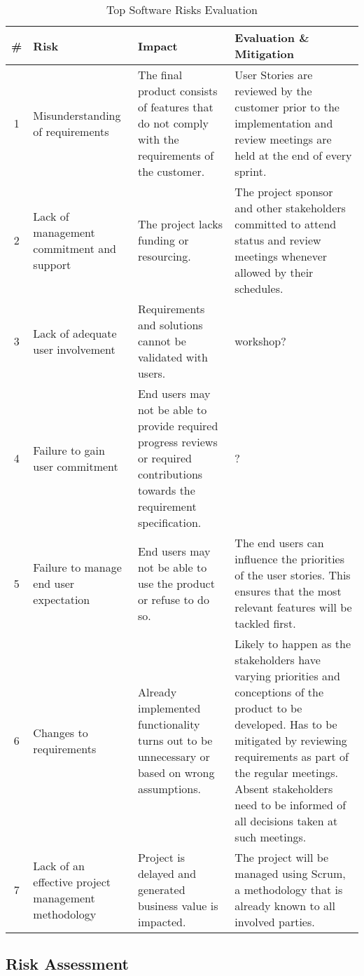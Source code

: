 \begin{table}[H]
\begin{tabular}{|c|p{80pt} p{140pt} p{140pt}|}
\hline \# & Risk & Impact & Evaluation \& Mitigation \\ 
\hline 1 & Misunderstanding of requirements & The final product consists of features that do not comply with the requirements of the customer. & User Stories are reviewed by the customer prior to the implementation and review meetings are held at the end of every sprint. \\ 
2 & Lack of management commitment and support & The project lacks funding or resourcing. & The project sponsor and other stakeholders committed to attend status and review meetings whenever allowed by their schedules. \\ 
3 & Lack of adequate user involvement & Requirements and solutions cannot be validated with users. & workshop? \\ 
4 & Failure to gain user commitment & End users may not be able to provide required progress reviews or required contributions towards the requirement specification. & ? \\ 
5 & Failure to manage end user expectation & End users may not be able to use the product or refuse to do so. & The end users can influence the priorities of the user stories. This ensures that the most relevant features will be tackled first. \\ 
6 & Changes to requirements & Already implemented functionality turns out to be unnecessary or based on wrong assumptions. & Likely to happen as the stakeholders have varying priorities and conceptions of the product to be developed. Has to be mitigated by reviewing requirements as part of the regular meetings. Absent stakeholders need to be informed of all decisions taken at such meetings. \\ 
7 & Lack of an effective project management methodology & Project is delayed and generated business value is impacted. & The project will be managed using Scrum, a methodology that is already known to all involved parties. \\ 
\hline 
\end{tabular} 
\caption{Top Software Risks Evaluation}
\label{tab:toprisks}
\end{table}

\subsection{Risk Assessment}




